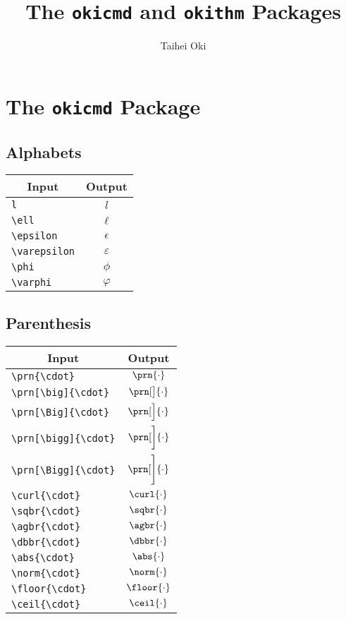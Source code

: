 \documentclass[a4paper, 11pt]{article}
\title{The \texttt{okicmd} and \texttt{okithm} Packages}
\author{Taihei Oki}
\begin{document}
\maketitle

\section{The \texttt{okicmd} Package}

\subsection{Alphabets}
\begin{center}
  \begin{tabular}{lc} \toprule
    \multicolumn{1}{c}{Input} & Output        \\\midrule
    \verb|l|    & $l$           \\
    \verb|\ell|    & $\ell$        \\
    \verb|\epsilon|    & $\epsilon$    \\
    \verb|\varepsilon|    & $\varepsilon$ \\
    \verb|\phi|    & $\phi$        \\
    \verb|\varphi|    & $\varphi$     \\
    \bottomrule
  \end{tabular}
\end{center}

\subsection{Parenthesis}
\begin{center}
  \begin{tabular}{lc} \toprule
    \multicolumn{1}{c}{Input} & Output               \\\midrule
    \verb|\prn{\cdot}|    & $\prn{\cdot}$        \\
    \verb|\prn[\big]{\cdot}|    & $\prn[\big]{\cdot}$  \\
    \verb|\prn[\Big]{\cdot}|    & $\prn[\Big]{\cdot}$  \\
    \verb|\prn[\bigg]{\cdot}|   & $\prn[\bigg]{\cdot}$ \\
    \verb|\prn[\Bigg]{\cdot}|   & $\prn[\Bigg]{\cdot}$ \\
    \verb|\curl{\cdot}|   & $\curl{\cdot}$       \\
    \verb|\sqbr{\cdot}|   & $\sqbr{\cdot}$       \\
    \verb|\agbr{\cdot}|   & $\agbr{\cdot}$       \\
    \verb|\dbbr{\cdot}|   & $\dbbr{\cdot}$       \\
    \verb|\abs{\cdot}|   & $\abs{\cdot}$        \\
    \verb|\norm{\cdot}|   & $\norm{\cdot}$       \\
    \verb|\floor{\cdot}|   & $\floor{\cdot}$      \\
    \verb|\ceil{\cdot}|   & $\ceil{\cdot}$       \\
    \bottomrule
  \end{tabular}
\end{center}
\end{document}
